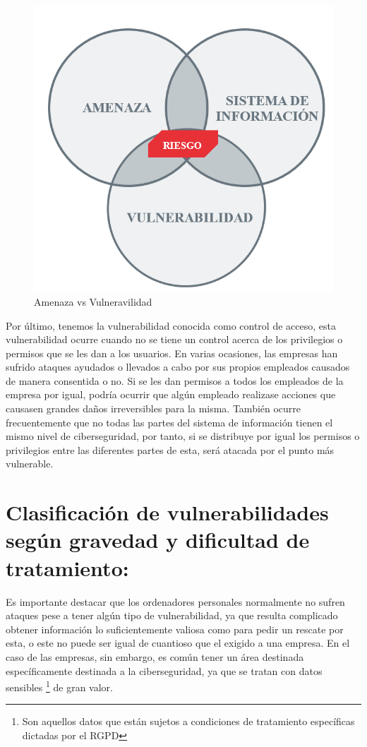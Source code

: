 \begin{figure}[tphb]
  		   \centering
     		   \includegraphics[width=5in]{vulnerabilidades.png}
  		   \caption{Amenaza vs Vulneravilidad \cite{incibe2}}
  		   \label{img:vulnerabilidades}
\end{figure}

Por último, tenemos la vulnerabilidad conocida como control de acceso, esta vulnerabilidad ocurre cuando no se tiene un control acerca de los privilegios o permisos que se les dan a los usuarios.
En varias ocasiones, las empresas han sufrido ataques ayudados o llevados a cabo por sus propios empleados causados de manera consentida o no.
Si se les dan permisos a todos los empleados de la empresa por igual, podría ocurrir que algún empleado realizase acciones que causasen grandes daños irreversibles para la misma.
También ocurre frecuentemente que no todas las partes del sistema de información tienen el mismo nivel de ciberseguridad, por tanto, si se distribuye por igual los permisos o privilegios entre las diferentes partes de esta, será atacada por el punto más vulnerable.

\section{Clasificación de vulnerabilidades según gravedad y dificultad de tratamiento:}

Es importante destacar que los ordenadores personales normalmente no sufren ataques pese a tener algún tipo de vulnerabilidad, ya que resulta complicado obtener información lo suficientemente valiosa como para pedir un rescate por esta, o este no puede ser igual de cuantioso que el exigido a una empresa.
En el caso de las empresas, sin embargo, es común tener un área destinada específicamente destinada a la ciberseguridad, ya que se tratan con datos sensibles \footnote{Son aquellos datos que están sujetos a condiciones de tratamiento específicas dictadas por el RGPD} de gran valor.

